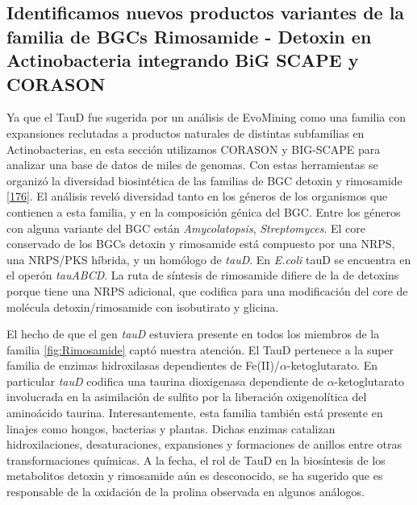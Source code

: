 \documentclass[12pt,twoside]{reedthesis}
\begin{document}
  \subsection{Identificamos nuevos productos variantes de la familia de
  BGCs Rimosamide - Detoxin en Actinobacteria integrando BiG SCAPE y
  CORASON}\label{identificamos-nuevos-productos-variantes-de-la-familia-de-bgcs-rimosamide---detoxin-en-actinobacteria-integrando-big-scape-y-corason}
  
  Ya que el TauD fue sugerida por un análisis de EvoMining como una
  familia con expansiones reclutadas a productos naturales de distintas
  subfamilias en Actinobacterias, en esta sección utilizamos CORASON y
  BIG-SCAPE para analizar una base de datos de miles de genomas. Con estas
  herramientas se organizó la diversidad biosintética de las familias de
  BGC detoxin y rimosamide
  {[}\protect\hyperlink{ref-mcclure_elucidating_2016}{176}{]}. El análisis
  reveló diversidad tanto en los géneros de los organismos que contienen a
  esta familia, y en la composición génica del BGC. Entre los géneros con
  alguna variante del BGC están \emph{Amycolatopsis}, \emph{Streptomyces}.
  El core conservado de los BGCs detoxin y rimosamide está compuesto por
  una NRPS, una NRPS/PKS híbrida, y un homólogo de \emph{tauD}. En
  \emph{E.coli} tauD se encuentra en el operón \emph{tauABCD}. La ruta de
  síntesis de rimosamide difiere de la de detoxins porque tiene una NRPS
  adicional, que codifica para una modificación del core de molécula
  detoxin/rimosamide con isobutirato y glicina.
  
  El hecho de que el gen \emph{tauD} estuviera presente en todos los
  miembros de la familia \autoref{fig:Rimosamide} captó nuestra atención.
  El TauD pertenece a la super familia de enzimas hidroxilasas
  dependientes de Fe(II)/\(\alpha\)-ketoglutarato. En particular
  \emph{tauD} codifica una taurina dioxigenasa dependiente de
  \(\alpha\)-ketoglutarato involucrada en la asimilación de sulfito por la
  liberación oxigenolítica del aminoácido taurina. Interesantemente, esta
  familia también está presente en linajes como hongos, bacterias y
  plantas. Dichas enzimas catalizan hidroxilaciones, desaturaciones,
  expansiones y formaciones de anillos entre otras transformaciones
  químicas. A la fecha, el rol de TauD en la biosíntesis de los
  metabolitos detoxin y rimosamide aún es desconocido, se ha sugerido que
  es responsable de la oxidación de la prolina observada en algunos
  análogos.
  
\end{document}
